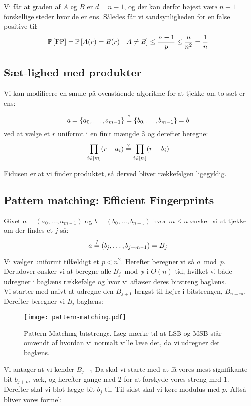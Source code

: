 Vi får at graden af $A$ og $B$ er $d = n-1$, og der kan derfor højest være $n - 1$ forskellige steder hvor de er ens. Således får vi sandsynligheden for en false positive til:
$$
  \P{\text{FP}}
  = \P{A(r) = B(r) \ | A \neq B}
  \leq \frac{n-1}{p}
  \leq \frac{n}{n^2}
  = \frac{1}{n}
$$

\subsection{Sæt-lighed med produkter}
Vi kan modificere en smule på ovenstående algoritme for at tjekke om to sæt er ens:

$$
  a = \{a_0, \dots, a_{m-1} \}
  \stackrel{?}{=}
  \{b_0, \dots, b_{m-1} \} = b
$$
ved at vælge et $r$ uniformt i en finit mængde $\mathbb S$ og derefter beregne:
$$
  \prod_{i \in [m]} (r - a_i) \stackrel{?}{=}
  \prod_{i \in [m]} (r - b_i)
$$

Fidusen er at vi finder produktet, så derved bliver rækkefølgen ligegyldig.






\subsection{Pattern matching: Efficient Fingerprints}
Givet $a = (a_0, \dots, a_{m-1})$ og $b = (b_0, \dots, b_{n-1})$ hvor $m \leq n$ ønsker vi at tjekke om der findes et $j$ så:
$$
  a \stackrel{?}{=} (b_j, \dots, b_{j+m-1}) = B_j
$$

Vi vælger uniformt tilfældigt et $p < n^2$. Herefter beregner vi så $a \bmod p$. Derudover ønsker vi at beregne alle $B_j \bmod p$ i $O(n)$ tid, hvilket vi både udregner i baglæns rækkefølge og hvor vi aflæser deres bitstreng baglæns.\\

Vi starter med naivt at udregne den $B_{j+1}$ længst til højre i bitstrengen, $B_{n-m}$. Derefter beregner vi $B_j$ baglæns:

\begin{figure}[H]
  \begin{center}
  \texttt{[image: pattern-matching.pdf]}
  \end{center}
  \caption{Pattern Matching bitstrenge. Læg mærke til at LSB og MSB står omvendt af hvordan vi normalt ville læse det, da vi udregner det baglæns.}
  \label{fig:pattern}
\end{figure}

Vi antager at vi kender $B_{j+1}$ Da skal vi starte med at få vores mest signifikante bit $b_{j+m}$ væk, og herefter gange med 2 for at forskyde vores streng med 1. Derefter skal vi blot lægge bit $b_j$ til. Til sidst skal vi køre modulus med $p$. Altså bliver vores formel:

